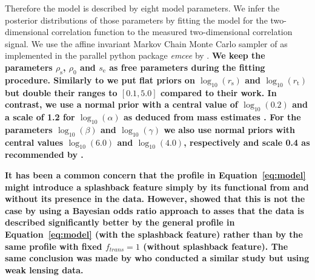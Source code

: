 \documentclass[iop, apjl, twocolappendix, numberedappendix]{emulateapj}
\begin{document}
Therefore the model is described by eight model parameters.
We infer the posterior distributions of those parameters by fitting the model for the two-dimensional correlation
function to the measured two-dimensional correlation signal. 
We use the affine invariant Markov Chain Monte Carlo sampler of \citet{goodman2010ensemble} as
implemented in the parallel python package {\it emcee} by
\citet{foreman2013emcee}. 
\textbf{We keep the parameters $\rho_{\mathrm{s}}$, $\rho_0$ and $s_{\mathrm{e}}$ 
as free parameters during the fitting procedure. Similarly to \citet{more2016detection} 
we put flat priors on $\log_{10}(r_{\mathrm{s}})$ and $\log_{10}(r_{\mathrm{t}})$ but double 
their ranges to $[0.1,5.0]$ compared to their work. In contrast, 
we use a normal prior with a central value of $\log_{10}(0.2)$ and a scale of 1.2 
for $\log_{10}(\alpha)$ as deduced from mass estimates \citep{gao2008redshift}. 
For the parameters $\log_{10}(\beta)$ and $\log_{10}(\gamma)$ we also use normal 
priors with central values $\log_{10}(6.0)$ and $\log_{10}(4.0)$, respectively 
and scale 0.4 as recommended by \citet{diemer2014dependence}.}

\textbf{It has been a common concern that the profile in Equation~\ref{eq:model} might introduce
a splashback feature simply by its functional from and without its presence in the data.
However, \citet{baxter2017halo} showed that this is not the case by using a Bayesian odds 
ratio approach to asses that the data is described significantly better by the general 
profile in Equation~\ref{eq:model} (with the splashback feature)
rather than by the same profile with fixed $f_{trans} = 1$ (without splashback feature).
The same conclusion was made by \citet{umetsu2017lensing} who conducted a similar study but
using weak lensing data.}
\end{document}

